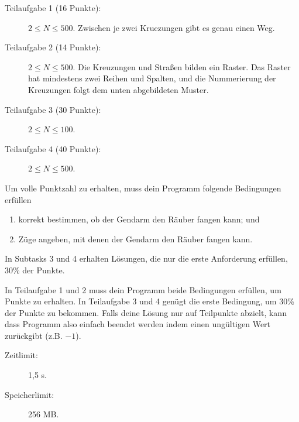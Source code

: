 \documentclass{boi2014-de}
\begin{document}
    \begin{description}
        \item[Teilaufgabe 1 (16 Punkte):] $2 \le N \le 500$. 
        Zwischen je zwei Kruezungen gibt es genau einen Weg.
        \item[Teilaufgabe 2 (14 Punkte):] $2 \le N \le 500$. 
        Die Kreuzungen und Straßen bilden ein Raster.  Das Raster hat mindestens zwei Reihen und Spalten,
        und die Nummerierung der Kreuzungen folgt dem unten abgebildeten Muster.
        \begin{figure}[h!]
           \centering
        \end{figure}
        \item[Teilaufgabe 3 (30 Punkte):] $2 \le N \le 100$.
        \item[Teilaufgabe 4 (40 Punkte):] $2 \le N \le 500$.
    \end{description}
    
    Um volle Punktzahl zu erhalten, muss dein Programm folgende Bedingungen erfüllen
    \begin{enumerate}
    	\item korrekt bestimmen, ob der Gendarm den Räuber fangen kann; und
	\item Züge angeben, mit denen der Gendarm den Räuber fangen kann.
    \end{enumerate}
    
    In Subtasks 3 und 4 erhalten Lösungen, 
    die nur die erste Anforderung erfüllen, 30\% der Punkte.
    
    In Teilaufgabe 1 und 2 muss dein Programm beide Bedingungen erfüllen, um Punkte zu erhalten.
    In Teilaufgabe 3 und 4 genügt die erste Bedingung, um 30\% der Punkte zu bekommen.
    Falls deine Lösung nur auf Teilpunkte abzielt, kann dass Programm also einfach beendet werden indem  einen ungültigen Wert zurückgibt (z.B. $-1$).

    \Constraints
    
    \begin{description}
        \item[Zeitlimit:] 1,5 s.
        \item[Speicherlimit:] 256 MB.
    \end{description}
\end{document}
